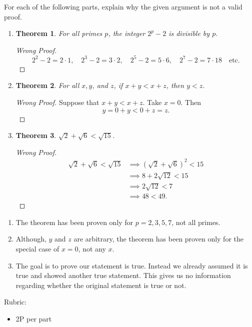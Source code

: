 \documentclass{article}
\newtheorem*{theorem}{Theorem}
\theoremstyle{definition}
\begin{document}
\begin{question}{6}
    For each of the following parts, explain why the given argument is not a valid proof.
    \begin{enumerate}
        \item \begin{theorem} For all primes $p$, the integer $2^p-2$ is divisible by $p$.
        		\end{theorem}
		\begin{proof}[Wrong Proof] 
		\[
		2^2 - 2 = 2 \cdot 1, \quad  2^3 - 2 = 3 \cdot 2, \quad 2^5 - 2 = 5 \cdot 6, \quad 2^7 - 2 = 7 \cdot 18 \quad \text{etc.}
		\]
		\end{proof}
		
	\item \begin{theorem} For all $x, y$, and $z$, if $x+y <  x+z$, then $y < z$.
        		\end{theorem}
		\begin{proof}[Wrong Proof] 
		Suppose that $x+y <  x+z$. Take $x=0$. Then 
		\[
		y = 0 + y < 0 + z = z.
		\]
		\end{proof}
		
	\item \begin{theorem} $\sqrt{2} + \sqrt{6}  <  \sqrt{15}$.
        		\end{theorem}
		\begin{proof}[Wrong Proof] 
		\begin{align*}
		\sqrt{2} + \sqrt{6}  <  \sqrt{15} &\implies (\sqrt{2} + \sqrt{6})^2  <  15\\
		&\implies 8 + 2\sqrt{12} < 15\\
		&\implies 2\sqrt{12} < 7\\
		&\implies 48 < 49.
		\end{align*}
		\end{proof}
    \end{enumerate}
\end{question}
\begin{solution}
    \begin{enumerate}
      \item The theorem has been proven only for $p = 2, 3, 5, 7$, not all primes.
      \item Although, $y$ and $z$ are arbitrary, the theorem has been proven only for the special case of $x=0$, not any $x$.
      \item The goal is to prove our statement is true. Instead we already assumed it is true and showed another true statement. This gives us no information regarding whether the original statement is true or not.
    \end{enumerate}
    
{\color{red} Rubric:
\begin{itemize}
\item 2P per part
\end{itemize}}
\end{solution}
\end{document}

